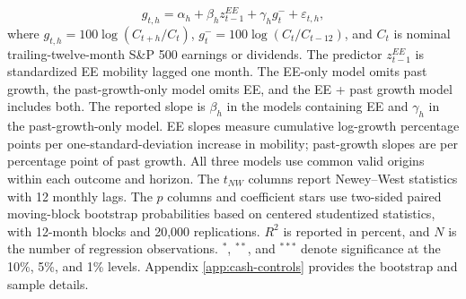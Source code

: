 \begin{table}[H]
\begin{minipage}[t]{\linewidth}
\[g_{t,h}=\alpha_h+\beta_h z_{t-1}^{EE}+\gamma_h g_t^-+\varepsilon_{t,h},\]
where $g_{t,h}=100\log(C_{t+h}/C_t)$, $g_t^-=100\log(C_t/C_{t-12})$, and $C_t$ is nominal trailing-twelve-month S\&P 500 earnings or dividends. The predictor $z_{t-1}^{EE}$ is standardized EE mobility lagged one month. The EE-only model omits past growth, the past-growth-only model omits EE, and the EE + past growth model includes both. The reported slope is $\beta_h$ in the models containing EE and $\gamma_h$ in the past-growth-only model. EE slopes measure cumulative log-growth percentage points per one-standard-deviation increase in mobility; past-growth slopes are per percentage point of past growth. All three models use common valid origins within each outcome and horizon. The $t_{NW}$ columns report Newey--West statistics with 12 monthly lags. The $p$ columns and coefficient stars use two-sided paired moving-block bootstrap probabilities based on centered studentized statistics, with 12-month blocks and 20,000 replications. $R^2$ is reported in percent, and $N$ is the number of regression observations. $^{*}$, $^{**}$, and $^{***}$ denote significance at the 10\%, 5\%, and 1\% levels. Appendix \ref{app:cash-controls} provides the bootstrap and sample details.\par\end{minipage}
\end{table}
